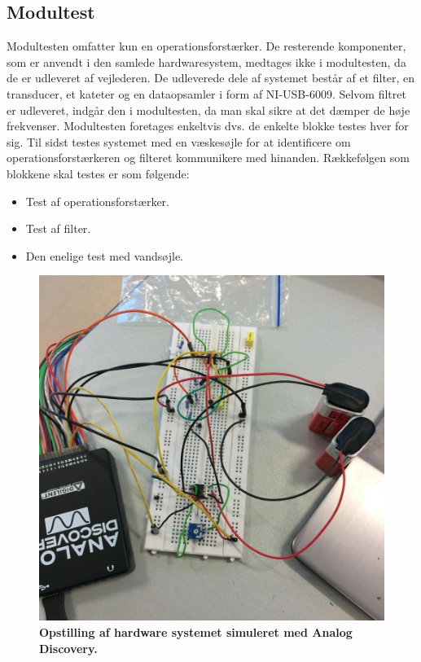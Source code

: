 \subsection{Modultest}
Modultesten omfatter kun en operationsforstærker. De resterende komponenter, som er anvendt i den samlede hardwaresystem, medtages ikke i modultesten, da de er udleveret af vejlederen. De udleverede dele af systemet består af et filter, en transducer, et kateter og en dataopsamler i form af NI-USB-6009. Selvom filtret er udleveret, indgår den i modultesten, da man skal sikre at det dæmper de høje frekvenser.  Modultesten foretages enkeltvis dvs. de enkelte blokke testes hver for sig. Til sidst testes systemet med en væskesøjle for at identificere om operationsforstærkeren og filteret kommunikere med hinanden. Rækkefølgen som blokkene skal testes er som følgende:
\begin{itemize}
\item Test af operationsforstærker.
\item Test af filter.
\item Den enelige test med vandsøjle.
\end{itemize}
\begin{figure}[H]
\includegraphics[width =1.0\textwidth , center]{billeder/testOpstilling}
\caption{\textbf{Opstilling af hardware systemet simuleret med Analog Discovery.}}
\end{figure}
